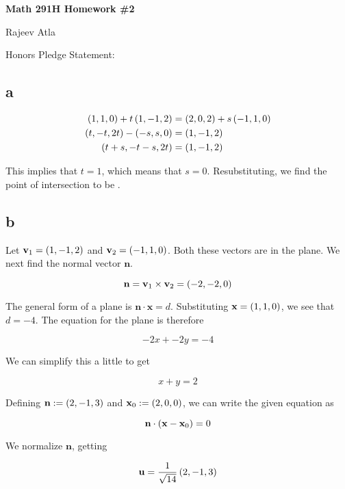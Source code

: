 \documentclass{article}
\begin{document}
\begin{center}
    \Large \textbf{Math 291H Homework \#2}
\end{center}
\begin{center}
    \Large Rajeev Atla
\end{center}


Honors Pledge Statement: 


\subsection*{a}

\begin{align*}
  \left ( 1, 1, 0 \right) + t \left ( 1, -1, 2 \right) &= \left ( 2, 0, 2 \right) + s \left ( -1, 1, 0 \right) \\
  \left ( t, -t, 2t \right) - \left ( -s, s, 0 \right) &= \left ( 1, -1, 2 \right) \\
  \left ( t + s, -t-s, 2t \right) &= \left ( 1, -1, 2 \right) \\
\end{align*}

This implies that $t=1$, which means that $s=0$.
Resubstituting, we find the point of intersection to be .

\subsection*{b}

Let $\textbf{v}_1 = \left ( 1, -1, 2 \right)$ and $\textbf{v}_2 = \left ( -1, 1, 0 \right)$.
Both these vectors are in the plane.
We next find the normal vector $\bm{n}$.

$$
\textbf{n} = \textbf{v}_1 \times \textbf{v}_2 = \left ( -2, -2, 0 \right)
$$

The general form of a plane is $\bm{n} \cdot \bm{x} = d$.
Substituting $\textbf{x} = \left ( 1, 1, 0 \right)$, we see that $d=-4$.
The equation for the plane is therefore

$$
-2 x + -2y = -4
$$

We can simplify this a little to get

$$
\boxed{x + y = 2}
$$

Defining $\textbf{n} := \left ( 2, -1, 3 \right)$ and $\textbf{x}_0 := \left ( 2, 0, 0 \right)$, we can write the given equation as

$$
\textbf{n} \cdot \left ( \textbf{x} - \textbf{x}_0 \right) = 0
$$

We normalize $\bm{n}$, getting

$$
\textbf{u} = \frac{1}{\sqrt{14}} \left ( 2, -1, 3 \right)
$$
\end{document}
